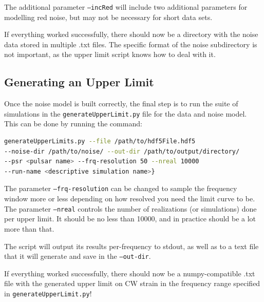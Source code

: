 \documentclass[12pt]{article}
\begin{document}
The additional parameter \texttt{--incRed} will include two additional parameters for
modelling red noise, but may not be necessary for short data sets.

If everything worked successfully, there should now be a directory with the
noise data stored in multiple .txt files. The specific format of the noise
subdirectory is not important, as the upper limit script knows how to deal with
it.

\subsection*{Generating an Upper Limit}

Once the noise model is built correctly, the final step is to run the suite of
simulations in the \texttt{generateUpperLimit.py} file for the data and noise model. This
can be done by running the command:
\\
\begin{lstlisting}[language=bash]
generateUpperLimits.py --file /path/to/hdf5File.hdf5
--noise-dir /path/to/noise/ --out-dir /path/to/output/directory/
--psr <pulsar name> --frq-resolution 50 --nreal 10000
--run-name <descriptive simulation name>}
\end{lstlisting}

The parameter \texttt{--frq-resolution} can be changed to sample the frequency window
more or less depending on how resolved you need the limit curve to be. The
parameter \texttt{--nreal} controls the number of realizations (or simulations) done per
upper limit. It should be no less than 10000, and in practice should be a lot
more than that.

The script will output its results per-frequency to stdout, as well as to a text
file that it will generate and save in the \texttt{--out-dir}. 

If everything worked successfully, there should now be a numpy-compatible .txt
file with the generated upper limit on CW strain in the frequency range
specified in \texttt{generateUpperLimit.py}!

\newpage

\nocite{*}




\end{document}
